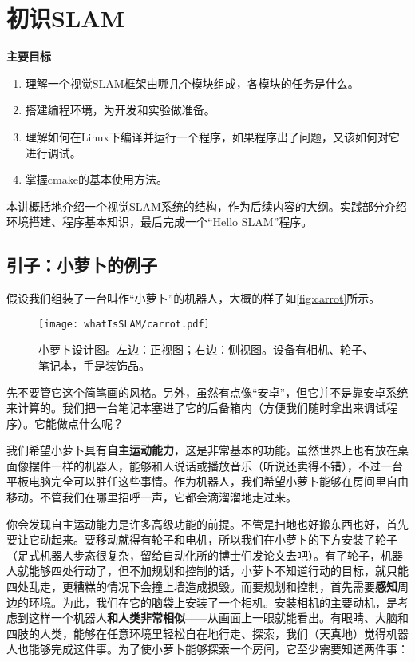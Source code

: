 
\chapter{初识SLAM}
\begin{mdframed}
	\textbf{主要目标}
	\begin{enumerate}[labelindent=0em,leftmargin=1.5em]
		\item 理解一个视觉SLAM框架由哪几个模块组成，各模块的任务是什么。
		\item 搭建编程环境，为开发和实验做准备。
		\item 理解如何在Linux下编译并运行一个程序，如果程序出了问题，又该如何对它进行调试。
		\item 掌握cmake的基本使用方法。
	\end{enumerate}
\end{mdframed}

本讲概括地介绍一个视觉SLAM系统的结构，作为后续内容的大纲。实践部分介绍环境搭建、程序基本知识，最后完成一个“Hello SLAM”程序。
\newpage

\newpage

\section{引子：小萝卜的例子}
假设我们组装了一台叫作“小萝卜”的机器人，大概的样子如\autoref{fig:carrot}所示。%

\begin{figure}[!ht]
	\centering
	\texttt{[image: whatIsSLAM/carrot.pdf]}
	\caption{小萝卜设计图。左边：正视图；右边：侧视图。设备有相机、轮子、笔记本，手是装饰品。}
	\label{fig:carrot}
\end{figure}

先不要管它这个简笔画的风格。另外，虽然有点像“安卓”，但它并不是靠安卓系统来计算的。我们把一台笔记本塞进了它的后备箱内（方便我们随时拿出来调试程序）。它能做点什么呢？

我们希望小萝卜具有\textbf{自主运动能力}，这是非常基本的功能。虽然世界上也有放在桌面像摆件一样的机器人，能够和人说话或播放音乐（听说还卖得不错），不过一台平板电脑完全可以胜任这些事情。作为机器人，我们希望小萝卜能够在房间里自由移动。不管我们在哪里招呼一声，它都会滴溜溜地走过来。

你会发现自主运动能力是许多高级功能的前提。不管是扫地也好搬东西也好，首先要让它动起来。要移动就得有轮子和电机，所以我们在小萝卜的下方安装了轮子（足式机器人步态很复杂，留给自动化所的博士们发论文去吧）。有了轮子，机器人就能够四处行动了，但不加规划和控制的话，小萝卜不知道行动的目标，就只能四处乱走，更糟糕的情况下会撞上墙造成损毁。而要规划和控制，首先需要\textbf{感知}周边的环境。为此，我们在它的脑袋上安装了一个相机。安装相机的主要动机，是考虑到这样一个机器人\textbf{和人类非常相似}——从画面上一眼就能看出。有眼睛、大脑和四肢的人类，能够在任意环境里轻松自在地行走、探索，我们（天真地）觉得机器人也能够完成这件事。为了使小萝卜能够探索一个房间，它至少需要知道两件事：

